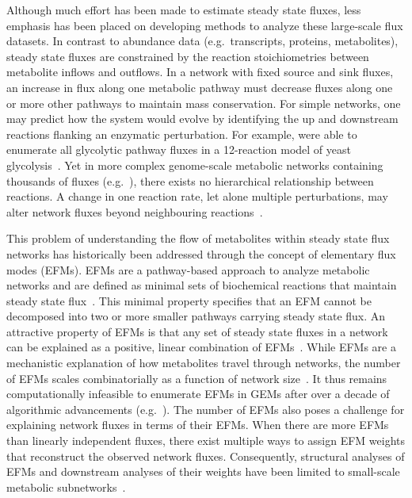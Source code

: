 \documentclass[12pt]{article}
\begin{document}
Although much effort has been made to estimate steady state fluxes, less
emphasis has been placed on developing methods to analyze these
large-scale flux datasets. In contrast to abundance data (e.g.\
transcripts, proteins, metabolites), steady state fluxes are constrained
by the reaction stoichiometries between metabolite inflows and outflows.
In a network with fixed source and sink fluxes, an increase in flux along
one metabolic pathway must decrease fluxes along one or more other
pathways to maintain mass conservation. For simple networks, one may
predict how the system would evolve by identifying the up and downstream
reactions flanking an enzymatic perturbation. For example,
\citeauthor{SchwartzJean-Marc2006Qema} were able to
enumerate all glycolytic pathway fluxes in a 12-reaction model of yeast
glycolysis~\citep{SchwartzJean-Marc2006Qema}. Yet in more complex genome-scale
metabolic networks containing thousands of fluxes
(e.g.\ \cite{BrunkElizabeth2018Reat,RobinsonJonathanL2020Aaoh,WangHao2021Gmnr}),
there exists no hierarchical relationship between reactions. A change in one
reaction rate, let alone multiple perturbations, may alter network fluxes
beyond neighbouring reactions~\citep{NobileMarcoS2021Agsa}.

This problem of understanding the flow of metabolites within steady state
flux networks has historically been addressed through the concept of
elementary flux modes (EFMs). EFMs are a pathway-based approach to analyze
metabolic networks and are defined as minimal sets of biochemical
reactions that maintain steady state flux~\citep{SchusterStefan1994Oefm}.
This minimal property specifies that an EFM cannot be decomposed into two
or more smaller pathways carrying steady state flux. An attractive
property of EFMs is that any set of steady state fluxes in a network can
be explained as a positive, linear combination of
EFMs~\citep{SchusterStefan1999Doef}. While EFMs are a mechanistic
explanation of how metabolites travel through networks, the number of EFMs
scales combinatorially as a function of network
size~\citep{AcunaVicente2009Maci}. It thus remains computationally
infeasible to enumerate EFMs in GEMs after over a decade of algorithmic
advancements (e.g.\
\citealt{GagneurJulien2004Coem,TerzerMarco2008Lcoe,BuchnerBiancaA2021EaPp}).
The number of EFMs also poses a challenge for explaining network fluxes in
terms of their EFMs. When there are more EFMs than linearly independent
fluxes, there exist multiple ways to assign EFM weights that reconstruct
the observed network fluxes. Consequently, structural analyses of EFMs and
downstream analyses of their weights have been limited to small-scale
metabolic
subnetworks~\citep{FakihIbrahim2023Dgmm,MpabanziLiliane2022Frca,ToyaYoshihiro2022Mpef,MatsudaFumio2011Esoy,SchwartzJean-Marc2006Qema}.
\end{document}
